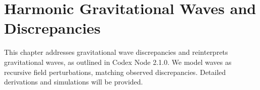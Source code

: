 \section{Harmonic Gravitational Waves and Discrepancies}
This chapter addresses gravitational wave discrepancies and reinterprets gravitational waves, as outlined in Codex Node 2.1.0. We model waves as recursive field perturbations, matching observed discrepancies. Detailed derivations and simulations will be provided.
